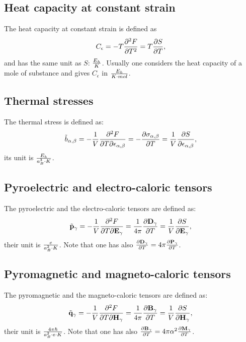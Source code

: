 \documentclass[12pt,a4paper]{article}
\begin{document}
{\subsection{\color{web-blue}Heat capacity at constant strain}
The heat capacity at constant strain is defined as
\begin{equation}
C_\epsilon= - T {\partial^2 F \over \partial T^2} = 
T {\partial S \over \partial T},
\end{equation}
and has the same unit as $S$: $E_h\over K$. Usually one considers the heat
capacity of a mole of substance and gives $C_\epsilon$ in 
${E_h\over K \cdot mol}$.

\subsection{\color{web-blue}Thermal stresses}
The thermal stress is defined as:
\begin{equation}
\tilde b_{\alpha,\beta} = 
-{1\over V} {\partial^2 F \over \partial T
\partial \epsilon_{\alpha,\beta}}=
-{\partial \sigma_{\alpha,\beta} \over \partial T}=
{1\over V} {\partial S \over \partial {\bf \epsilon}_{\alpha,\beta}},
\end{equation}
its unit is ${E_h \over a_B^3 \cdot K}$.

\subsection{\color{web-blue}Pyroelectric and electro-caloric tensors}
The pyroelectric and the electro-caloric tensors are defined as:
\begin{equation}
\tilde {\bf p}_\gamma =
-{1\over V} {\partial^2 F \over \partial T
\partial {\bf E}_\gamma}=
{1\over 4 \pi} {\partial {\bf D}_\gamma \over \partial T}=
{1\over V} {\partial S \over \partial {\bf E}_{\gamma}},
\end{equation}
their unit is ${e \over a_B^2 \cdot K}$. Note that one has also
${\partial {\bf D}_\gamma \over \partial T}=
4 \pi {\partial {\bf P}_\gamma \over \partial T}$. 

\subsection{\color{web-blue}Pyromagnetic and magneto-caloric tensors}
The pyromagnetic and the magneto-caloric tensors are defined as:
\begin{equation}
\tilde {\bf q}_\gamma = 
-{1\over V} {\partial^2 F \over \partial T
\partial {\bf H}_\gamma}=
{1\over 4 \pi} {\partial {\bf B}_\gamma \over \partial T}=
{1\over V} {\partial S \over \partial {\bf H}_{\gamma}},
\end{equation}
their unit is ${4 \pi \hbar \over a_B^2 \cdot e \cdot K}$. 
Note that one has also
${\partial {\bf B}_\gamma \over \partial T}= 4 \pi \alpha^2
{\partial {\bf M}_\gamma \over \partial T}$.

}
\end{document}
